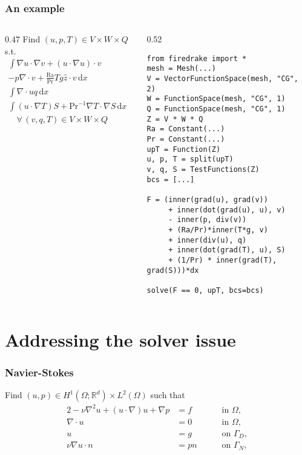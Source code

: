 \documentclass[presentation]{beamer}
\newcommand{\honev}{\ensuremath{{H}^1(\Omega; \mathbb{R}^d)}\xspace}
\newcommand{\ltwo}{\ensuremath{{L}^2(\Omega)}\xspace}
\newcommand{\advect}[2]{\ensuremath{(#2 \cdot \nabla) #1}}
\begin{document}
\begin{frame}[fragile]
  \frametitle{An example}
  \begin{columns}
    \begin{column}{0.47\framewidth}
      {\footnotesize
        Find $(u, p, T) \in V\times W\times Q$ s.t.
        \begin{align*}
          \int\!\nabla u \cdot \nabla v + (u \cdot \nabla u) \cdot v \\
          - p\nabla\cdot v + \frac{\text{Ra}}{\text{Pr}} Tg \hat{z} \cdot v\,\text{d}x &= 0 \\
          \int\!\nabla\cdot u q\,\text{d}x&= 0\\
          \int\! (u\cdot \nabla T) S + \text{Pr}^{-1} \nabla T \cdot \nabla
          S\,\text{d}x &= 0\\
          \quad \forall\, (v,q,T) \in V\times W \times Q
        \end{align*}
        }
    \end{column}
      \begin{column}{0.52\framewidth}
\begin{verbatim}
from firedrake import *
mesh = Mesh(...)
V = VectorFunctionSpace(mesh, "CG", 2)
W = FunctionSpace(mesh, "CG", 1)
Q = FunctionSpace(mesh, "CG", 1)
Z = V * W * Q
Ra = Constant(...)
Pr = Constant(...)
upT = Function(Z)
u, p, T = split(upT)
v, q, S = TestFunctions(Z)
bcs = [...]

F = (inner(grad(u), grad(v))
     + inner(dot(grad(u), u), v)
     - inner(p, div(v))
     + (Ra/Pr)*inner(T*g, v)
     + inner(div(u), q)
     + inner(dot(grad(T), u), S)
     + (1/Pr) * inner(grad(T), grad(S)))*dx

solve(F == 0, upT, bcs=bcs)
\end{verbatim}
      \end{column}
  \end{columns}
\end{frame}


\section{Addressing the solver issue}
\begin{frame}
  \frametitle{Navier-Stokes}
Find $(u, p) \in \honev \times \ltwo$ such that
\begin{alignat*}{2}
  -  \nu \nabla^2 u + \advect{u}{u} + \nabla p &= f \quad && \text{ in } \Omega, \label{eqn:momentum} \\
  \nabla \cdot u &= 0 \quad && \text{ in } \Omega, \\
  u &= g \quad && \text{ on } \Gamma_D, \\
  \nu \nabla u \cdot n &= pn \quad && \text{ on } \Gamma_N,
\end{alignat*}
\end{frame}
\end{document}
